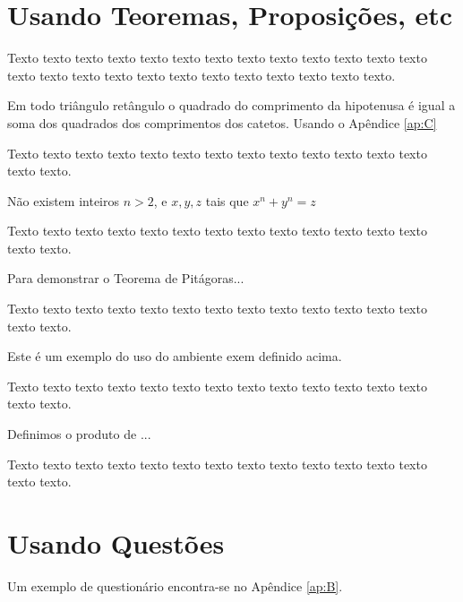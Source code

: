  
\section{Usando Teoremas, Proposições, etc}

 Texto texto texto texto texto texto texto texto texto texto texto texto texto texto texto texto texto texto texto texto texto texto texto texto texto.

\begin{teo}[Pitágoras]
	Em todo triângulo retângulo o quadrado do comprimento da
	hipotenusa é igual a soma dos quadrados dos comprimentos dos catetos. Usando o Apêndice \ref{ap:C}
\end{teo}


Texto texto texto texto texto texto texto texto texto texto texto texto texto texto texto.

\begin{teo}[Fermat]
	Não existem inteiros $n > 2$, e $x, y, z$ tais que $x^n + y^n = z$
\end{teo}

Texto texto texto texto texto texto texto texto texto texto texto texto texto texto texto.

\begin{prop}
	Para demonstrar o Teorema de Pitágoras...
\end{prop}

Texto texto texto texto texto texto texto texto texto texto texto texto texto texto texto.

\begin{exem}
	Este é um exemplo do uso do ambiente exem definido acima.
\end{exem}

Texto texto texto texto texto texto texto texto texto texto texto texto texto texto texto.


\begin{xdefinicao}
	Definimos o produto de ...
\end{xdefinicao}

Texto texto texto texto texto texto texto texto texto texto texto texto texto texto texto.

\section{Usando Questões} 

Um exemplo de questionário encontra-se no Apêndice \ref{ap:B}.


